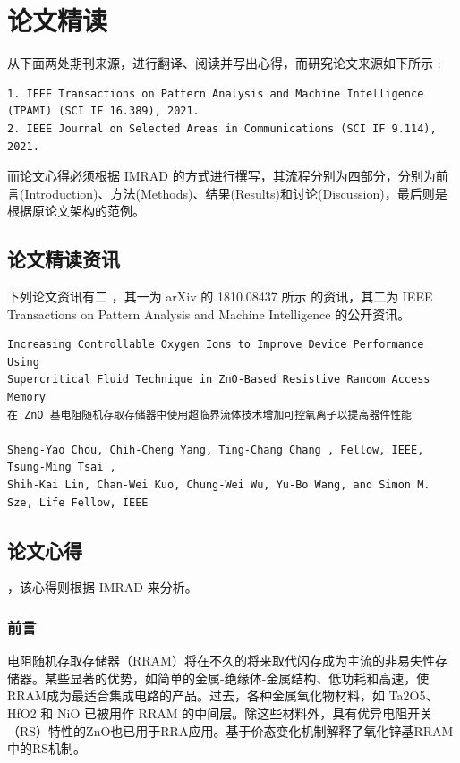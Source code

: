 \chapter{论文精读}
\label{chap:1}

从下面两处期刊来源，进行翻译、阅读并写出心得，而研究论文来源如下所示 :
\begin{Verbatim}
1. IEEE Transactions on Pattern Analysis and Machine Intelligence
(TPAMI) (SCI IF 16.389), 2021.
2. IEEE Journal on Selected Areas in Communications (SCI IF 9.114), 2021.
\end{Verbatim}

而论文心得必须根据 IMRAD 的方式进行撰写，其流程分别为四部分，分别为前言(Introduction)、方法(Methods)、结果(Results)和讨论(Discussion)，最后则是根据原论文架构的范例。

\section{论文精读资讯}

下列论文资讯有二 \cite{garcia2020admd} ，其一为 arXiv 的 1810.08437 所示 的资讯，其二为 IEEE Transactions on Pattern Analysis and Machine Intelligence 的公开资讯。

\begin{Verbatim}
Increasing Controllable Oxygen Ions to Improve Device Performance Using 
Supercritical Fluid Technique in ZnO-Based Resistive Random Access Memory
在 ZnO 基电阻随机存取存储器中使用超临界流体技术增加可控氧离子以提高器件性能

Sheng-Yao Chou, Chih-Cheng Yang, Ting-Chang Chang , Fellow, IEEE, Tsung-Ming Tsai , 
Shih-Kai Lin, Chan-Wei Kuo, Chung-Wei Wu, Yu-Bo Wang, and Simon M. Sze, Life Fellow, IEEE
\end{Verbatim}


\section{论文心得}

，该心得则根据 IMRAD 来分析。

\subsection{前言}

电阻随机存取存储器（RRAM）将在不久的将来取代闪存成为主流的非易失性存储器。某些显著的优势，如简单的金属-绝缘体-金属结构、低功耗和高速，使RRAM成为最适合集成电路的产品。过去，各种金属氧化物材料，如 Ta2O5、HfO2 和 NiO 已被用作 RRAM 的中间层。除这些材料外，具有优异电阻开关（RS）特性的ZnO也已用于RRA应用。基于价态变化机制解释了氧化锌基RRAM中的RS机制。

